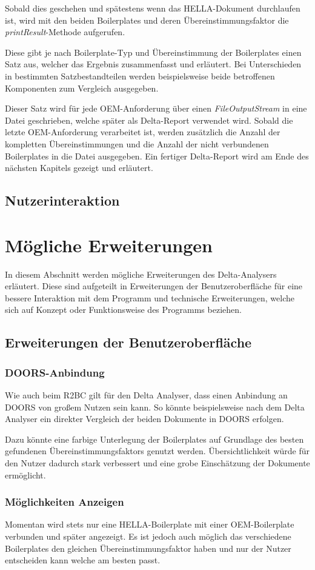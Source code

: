 \documentclass[12pt]{report}
\begin{document}
Sobald dies geschehen und spätestens wenn das HELLA-Dokument durchlaufen ist, wird mit den beiden Boilerplates und deren Übereinstimmungsfaktor die \textit{printResult}-Methode aufgerufen. 

Diese gibt je nach Boilerplate-Typ und Übereinstimmung der Boilerplates einen Satz aus, welcher das Ergebnis zusammenfasst und erläutert. Bei Unterschieden in bestimmten Satzbestandteilen werden beispielsweise beide betroffenen Komponenten zum Vergleich ausgegeben. 

Dieser Satz wird für jede OEM-Anforderung über einen \textit{FileOutputStream} in eine Datei geschrieben, welche später als Delta-Report verwendet wird. Sobald die letzte OEM-Anforderung verarbeitet ist, werden zusätzlich die Anzahl der kompletten Übereinstimmungen und die Anzahl der nicht verbundenen Boilerplates in die Datei ausgegeben. Ein fertiger Delta-Report wird am Ende des nächsten Kapitels gezeigt und erläutert.
\subsection{Nutzerinteraktion}
\section{Mögliche Erweiterungen}
In diesem Abschnitt werden mögliche Erweiterungen des Delta-Analysers erläutert. Diese sind aufgeteilt in Erweiterungen der Benutzeroberfläche für eine bessere Interaktion mit dem Programm und technische Erweiterungen, welche sich auf Konzept oder Funktionsweise des Programms beziehen.
\subsection[Benutzeroberfläche]{Erweiterungen der Benutzeroberfläche}
\subsubsection{DOORS-Anbindung}
Wie auch beim R2BC gilt für den Delta Analyser, dass einen Anbindung an DOORS von großem Nutzen sein kann. So könnte beispielsweise nach dem Delta Analyser ein direkter Vergleich der beiden Dokumente in DOORS erfolgen.

Dazu könnte eine farbige Unterlegung der Boilerplates auf Grundlage des besten gefundenen Übereinstimmungsfaktors genutzt werden. Übersichtlichkeit würde für den Nutzer dadurch stark verbessert und eine grobe Einschätzung der Dokumente ermöglicht.
\subsubsection{Möglichkeiten Anzeigen}
Momentan wird stets nur eine HELLA-Boilerplate mit einer OEM-Boilerplate verbunden und später angezeigt. Es ist jedoch auch möglich das verschiedene Boilerplates den gleichen Übereinstimmungsfaktor haben und nur der Nutzer entscheiden kann welche am besten passt.
\end{document}

